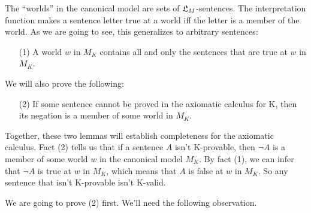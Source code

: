 
The ``worlds'' in the canonical model are sets of $\mathfrak{L}_M$-sentences. The
interpretation function makes a sentence letter true at a world iff the letter
is a member of the world. As we are going to see, this generalizes to arbitrary
sentences:
\begin{enumerate}[leftmargin=10mm]
  \item[(1)] A world $w$ in $M_K$ contains all and only the sentences that are
        true at $w$ in $M_K$.
\end{enumerate}
We will also prove the following:
\begin{enumerate}[leftmargin=10mm]
  \item[(2)] If some sentence cannot be proved in the axiomatic calculus for K,
        then its negation is a member of some world in $M_K$.
\end{enumerate}

Together, these two lemmas will establish completeness for the axiomatic
calculus. Fact (2) tells us that if a sentence $A$ isn't K-provable, then
$\neg A$ is a member of some world $w$ in the canonical model $M_K$. By fact
(1), we can infer that $\neg A$ is true at $w$ in $M_K$, which means that $A$ is
false at $w$ in $M_K$. So any sentence that isn't K-provable isn't K-valid.

We are going to prove (2) first. We'll need the following observation. 

